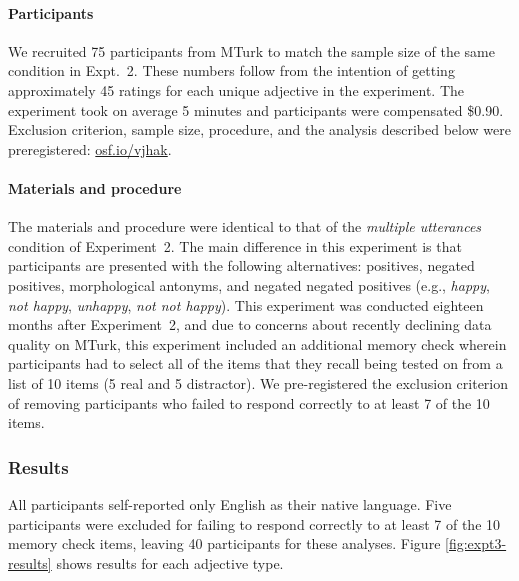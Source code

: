 \documentclass[floatsintext,doc]{apa6}
\let\oldparagraph\paragraph
\renewcommand{\paragraph}[1]{\oldparagraph{#1}\mbox{}}
\begin{document}
\paragraph{Participants}\label{participants-3}

We recruited 75 participants from MTurk to match the sample size of the same condition in Expt.~2.
These numbers follow from the intention of getting approximately 45 ratings for each unique adjective in the experiment.
The experiment took on average 5 minutes and participants were compensated \$0.90.
Exclusion criterion, sample size, procedure, and the analysis described below were preregistered: \url{osf.io/vjhak}.

\paragraph{Materials and procedure}\label{materials-3}

The materials and procedure were identical to that of the \emph{multiple utterances} condition of Experiment~2.
The main difference in this experiment is that participants are presented with the following alternatives: positives, negated positives, morphological antonyms, and negated negated positives (e.g., \emph{happy}, \emph{not happy}, \emph{unhappy}, \emph{not not happy}).
This experiment was conducted eighteen months after Experiment~2, and due to concerns about recently declining data quality on MTurk, this experiment included an additional memory check wherein participants had to select all of the items that they recall being tested on from a list of 10 items (5 real and 5 distractor). 
We pre-registered the exclusion criterion of removing participants who failed to respond correctly to at least 7 of the 10 items. 


\subsubsection{Results}

All participants self-reported only English as their native language. Five participants were excluded for failing to respond correctly to at least 7 of the 10 memory check items, leaving 40 participants for these analyses.
Figure \ref{fig:expt3-results} shows results for each adjective type.
\end{document}
